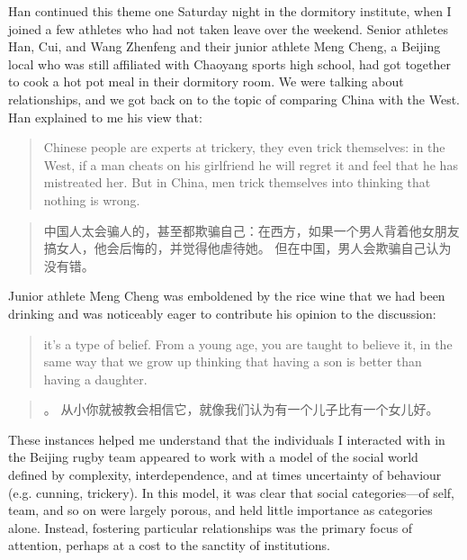\begin{CJK}{UTF8}{gbsn}
Han continued this theme one Saturday night in the dormitory institute, when I joined a few athletes who had not taken leave over the weekend. Senior athletes Han, Cui, and Wang Zhenfeng and their junior athlete Meng Cheng, a Beijing local who was still affiliated with Chaoyang sports high school, had got together to cook a hot pot meal in their dormitory room.  We were talking about relationships, and we got back on to the topic of comparing China with the West.  Han explained to me his view that:

\begin{quotation}
  Chinese people are experts at trickery, they even trick themselves: in the West, if a man cheats on his girlfriend he will regret it and feel that he has mistreated her.  But in China, men trick themselves into thinking that nothing is wrong.
\end{quotation}

\begin{quotation}
  中国人太会骗人的，甚至都欺骗自己：在西方，如果一个男人背着他女朋友搞女人，他会后悔的，并觉得他虐待她。 但在中国，男人会欺骗自己认为没有错。
\end{quotation}

Junior athlete Meng Cheng was emboldened by the rice wine that we had been drinking and was noticeably eager to contribute his opinion to the discussion:

  \begin{quotation}
    \textellipsis it's a type of belief. From a young age, you are taught to believe it, in the same way that we grow up thinking that having a son is better than having a daughter.
  \end{quotation}

  \begin{quotation}
    。 从小你就被教会相信它，就像我们认为有一个儿子比有一个女儿好。
  \end{quotation}

These instances helped me understand that the individuals I interacted with in the Beijing rugby team appeared to work with a model of the social world defined by complexity, interdependence, and at times uncertainty of behaviour (e.g. cunning, trickery).  In this model, it was clear that social categories---of self, team, and so on were largely porous, and held little importance as categories alone.  Instead, fostering particular relationships was the primary focus of attention, perhaps at a cost to the sanctity of institutions.




\end{CJK}
